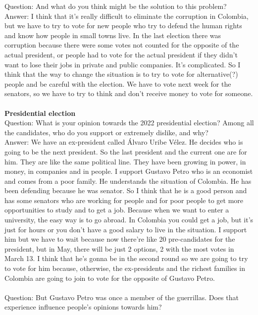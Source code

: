 \documentclass{phyasgn}\usepackage{nag}
\begin{document}
Question: And what do you think might be the solution to this problem?\\
Answer: I think that it’s really difficult to eliminate the corruption in Colombia, but we have to try to vote for new people who try to defend the human rights and know how people in small towns live. In the last election there was corruption because there were some votes not counted for the opposite of the actual president, or people had to vote for the actual president if they didn’t want to lose their jobs in private and public companies. It’s complicated. So I think that the way to change the situation is to try to vote for alternative(?) people and be careful with the election. We have to vote next week for the senators, so we have to try to think and don’t receive money to vote for someone.\\
\\
\textbf{Presidential election}\\
Question: What is your opinion towards the 2022 presidential election? Among all the candidates, who do you support or extremely dislike, and why?\\
Answer: We have an ex-president called Álvaro Uribe Vélez. He decides who is going to be the next president. So the last president and the current one are for him. They are like the same political line. They have been growing in power, in money, in companies and in people. I support Gustavo Petro who is an economist and comes from a poor family. He understands the situation of Colombia. He has been defending because he was senator. So I think that he is a good person and has some senators who are working for people and for poor people to get more opportunities to study and to get a job. Because when we want to enter a university, the easy way is to go abroad. In Colombia you could get a job, but it’s just for hours or you don’t have a good salary to live in the situation. I support him but we have to wait because now there’re like 20 pre-candidates for the president, but in May, there will be just 2 options, 2 with the most votes in March 13. I think that he’s gonna be in the second round so we are going to try to vote for him because, otherwise, the ex-presidents and the richest families in Colombia are going to join to vote for the opposite of Gustavo Petro.\\
\\
Question: But Gustavo Petro was once a member of the guerrillas. Does that experience influence people’s opinions towards him?\\
\end{document}

